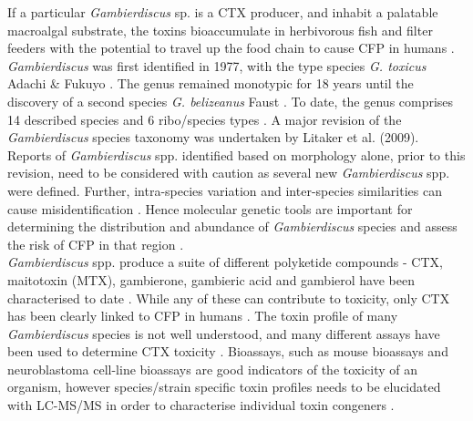 \documentclass[12pt]{article}
\begin{document}
If a particular \emph{Gambierdiscus} sp. is a CTX producer, and inhabit a palatable macroalgal substrate, the toxins bioaccumulate in herbivorous fish and filter feeders with the potential to travel up the food chain to cause CFP in humans  \citep{chinain1997intraspecific,holmes1998gambierdiscus}. 
\FloatBarrier
\emph{Gambierdiscus} was first identified in 1977, with the type species \emph{G. toxicus} Adachi \& Fukuyo \citep{adachi1979thecal}. 
The genus remained monotypic for 18 years until the discovery of a second species \emph{G. belizeanus} Faust \citep{faust1995observation}. 
To date, the genus comprises 14 described species and 6 ribo/species types
 \citep{smith2016new,fraga2016gambierdiscus,litaker2010global,adachi1979thecal,faust1995observation,chinain1999morphology,litaker2009taxonomy,dai2017taxonomic,nishimura2014morphology,rhodes2017new,kretzschmar2017characterization,fraga2011gambierdiscus,xu2014distribution,fraga2014genus} .
A major revision of the \emph{Gambierdiscus} species taxonomy was undertaken by Litaker et al. (2009). 
Reports of \emph{Gambierdiscus} spp. identified based on morphology alone, prior to this revision, need to be considered with caution as several new \emph{Gambierdiscus} spp. were defined. 
Further, intra-species variation and inter-species similarities can cause misidentification \citep{bravo2014cellular,kretzschmar2017characterization,kohli2014high}. 
Hence molecular genetic tools are important for determining the distribution and abundance of  \textit{Gambierdiscus} species and assess the risk of CFP in that region \citep{kohli2014high,kretzschmar2017characterization}. \\
\emph{Gambierdiscus} spp. produce a suite of different polyketide compounds - CTX, maitotoxin (MTX), gambierone, gambieric acid and gambierol have been characterised to date \citep{satake1993gambierol,nagai1992gambieric,rodriguez2015gambierone,murata1993structure,murata1989structures}. 
While any of these can contribute to toxicity, only CTX has been clearly linked to CFP in humans \citep{chinain1997intraspecific,holmes1998gambierdiscus}. 
The toxin profile of many \textit{Gambierdiscus} species is not well understood, and many different assays have been used to determine CTX toxicity \citep{globalcig}. 
Bioassays, such as mouse bioassays and neuroblastoma cell-line bioassays are good indicators of the toxicity of an organism, however species/strain specific toxin profiles needs to be elucidated with LC-MS/MS in order to characterise individual toxin congeners \citep{diogened2014chemistry}. 
\end{document}

